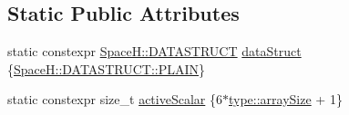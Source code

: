 \subsection*{Static Public Attributes}
\begin{DoxyCompactItemize}
\item 
static constexpr \mbox{\hyperlink{namespace_space_h_a4782f089179a3c269891f02482b072df}{Space\+H\+::\+D\+A\+T\+A\+S\+T\+R\+U\+CT}} \mbox{\hyperlink{classparticles_aa22397f7d90ec1ff63a9a8488d68c8f1}{data\+Struct}} \{\mbox{\hyperlink{namespace_space_h_a0af19f79a6498e99dbda772053d44a72af62eb0bf5e5c72e80983fbbac1cb70e5}{Space\+H\+::\+D\+A\+T\+A\+S\+T\+R\+U\+C\+T\+::\+P\+L\+A\+IN}}\}
\item 
static constexpr size\+\_\+t \mbox{\hyperlink{classparticles_ae1bbd3d94802cc0b3dc84b473a0115ab}{active\+Scalar}} \{6$\ast$\mbox{\hyperlink{struct_space_h_1_1_proto_type_a52e6df98534a97aa207f4447abd14d3c}{type\+::array\+Size}} + 1\}
\end{DoxyCompactItemize}
